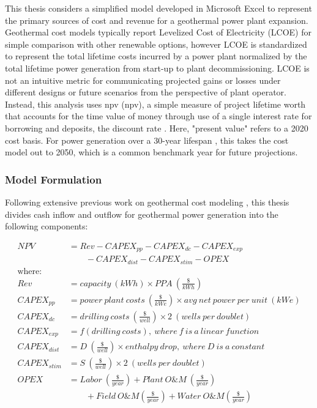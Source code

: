 This thesis considers a simplified model developed in Microsoft Excel to represent the primary sources of cost and revenue for a geothermal power plant expansion. Geothermal cost models typically report Levelized Cost of Electricity (LCOE) for simple comparison with other renewable options, however LCOE is standardized to represent the total lifetime costs incurred by a power plant normalized by the total lifetime power generation from start-up to plant decommissioning. LCOE is not an intuitive metric for communicating projected gains or losses under different designs or future scenarios from the perspective of plant operator. Instead, this analysis uses \acrlong{npv} (\acrshort{npv}), a simple measure of project lifetime worth that accounts for the time value of money through use of a single interest rate for borrowing and deposits, the discount rate \citep[p.\ 195-215]{de_neufville_flexibility_2011}. Here, "present value" refers to a 2020 cost basis. For power generation over a 30-year lifespan \citep{entingh_volume_2006}, this takes the cost model out to 2050, which is a common benchmark year for future projections. 

\subsubsection{Model Formulation}
Following extensive previous work on geothermal cost modeling \citep[e.g.,][]{augustine_hydrothermal_2009, beckers_introducing_2013, tester_economic_1990, tester_future_2006}, this thesis divides cash inflow and outflow for geothermal power generation into the following components:

\begin{equation}
    \label{eq:npv_components}
    \begin{aligned}
    NPV &= Rev - CAPEX_{pp} - CAPEX_{dc} - CAPEX_{exp} \\ 
        &\qquad- CAPEX_{dist} - CAPEX_{stim} - OPEX \\
    \text{where:}\\
    Rev &= capacity\ (kWh) \times PPA\ \left(\frac{\$}{kWh}\right) \\
    CAPEX_{pp} &= power\ plant\ costs\ \left(\frac{\$}{kWe}\right) \times
    avg\ net\ power\ per\ unit\ (kWe)\\
    CAPEX_{dc} &= drilling\ costs\ \left(\frac{\$}{well}\right) \times 2\ (wells\ per\ doublet)\\
    CAPEX_{exp} &= f(drilling\ costs),\ where\ f\ is\ a\ linear\ function\\
    CAPEX_{dist} &= D\ \left(\frac{\$}{well}\right) \times enthalpy\ drop,\ where\ D\ is\ a\ constant\\
    CAPEX_{stim} &= S\ \left(\frac{\$}{well}\right) \times 2\ (wells\ per\ doublet)\\
    OPEX &= Labor\ \left(\frac{\$}{year}\right)+ Plant\ O\&M\ \left(\frac{\$}{year}\right)\\
    &\qquad+ Field\ O\&M \left(\frac{\$}{year}\right) + Water\ O\&M \left(\frac{\$}{year}\right)
    \end{aligned}
\end{equation}

